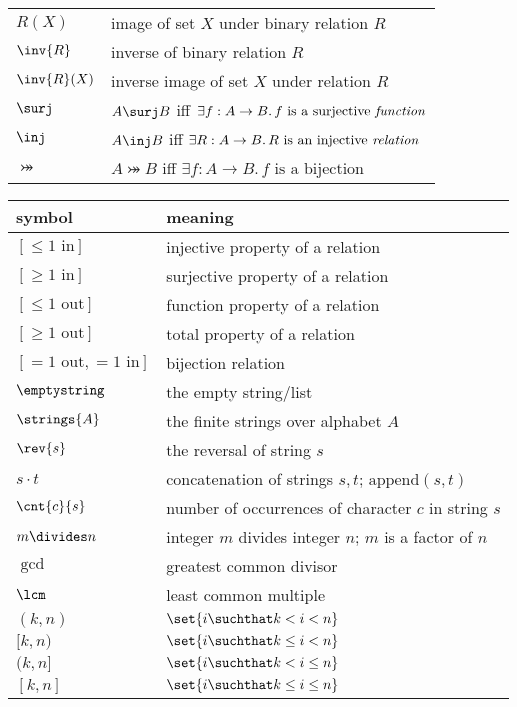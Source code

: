 \begin{center}
\begin{tabular}{ll}
$R(X)$         & image of set $X$ under binary relation $R$\\
$\inv{R}$      & inverse of binary relation $R$\\
$\inv{R}(X)$   & inverse image of set $X$ under relation $R$\\
$\surj$        & $A \surj B$ iff $\exists f:A \to B.\, f\text{ is a
  surjective \emph{function}}$\\
$\inj$         & $A \inj B$ iff $\exists R:A \to B.\, R\text{ is an
  injective \emph{relation}}$\\
$\bij$         & $A \bij B$ iff $\exists f:A \to B.\, f\text{ is a
  bijection}$
\end{tabular}
\end{center}

\begin{center}
\begin{tabular}{ll}
symbol         &  meaning\\
\hline
$[\leq 1\text{ in}]$  & injective property of a relation\\
$[\geq 1\text{ in}]$  & surjective property of a relation\\
$[\leq 1\text{ out}]$  & function property of a relation\\
$[\geq 1\text{ out}]$  & total property of a relation\\
$[= 1\text{ out}, = 1\text{ in}]$  & bijection relation\\
$\emptystring$ & the empty string/list\\
$\strings{A}$  & the finite strings over alphabet $A$\\
$\rev{s}$      & the reversal of string $s$\\
$s \cdot t$    & concatenation of strings $s,t$; $\text{append}(s,t)$\\
$\cnt{c}{s}$   & number of occurrences of character $c$ in string $s$\\
$m \divides n$ & integer $m$ divides integer $n$; $m$ is a factor of $n$\\
$\gcd$         & greatest common divisor\\
$\lcm$         & least common multiple\\
$(k, n)$       & $\set{i \suchthat k < i < n}$\\
$[k, n)$       & $\set{i \suchthat k \le i < n}$\\
$(k, n]$       & $\set{i \suchthat k < i \le n}$\\
$[k,n]$        & $\set{i \suchthat k \le i \le n}$\\

\end{tabular}
\end{center}
